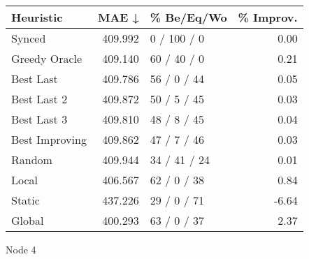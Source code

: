\begin{tabular}{lrlr}
\toprule
\textbf{Heuristic} & \textbf{MAE ↓} & \textbf{\% Be/Eq/Wo} & \textbf{\% Improv.} \\
\midrule
            Synced &        409.992 &          0 / 100 / 0 &                0.00 \\
     Greedy Oracle &        409.140 &          60 / 40 / 0 &                0.21 \\
         Best Last &        409.786 &          56 / 0 / 44 &                0.05 \\
       Best Last 2 &        409.872 &          50 / 5 / 45 &                0.03 \\
       Best Last 3 &        409.810 &          48 / 8 / 45 &                0.04 \\
    Best Improving &        409.862 &          47 / 7 / 46 &                0.03 \\
            Random &        409.944 &         34 / 41 / 24 &                0.01 \\
             Local &        406.567 &          62 / 0 / 38 &                0.84 \\
            Static &        437.226 &          29 / 0 / 71 &               -6.64 \\
            Global &        400.293 &          63 / 0 / 37 &                2.37 \\
\bottomrule
\end{tabular}
\caption{Node 4}
\label{tab:non_lr01_le1_bs2_4}
